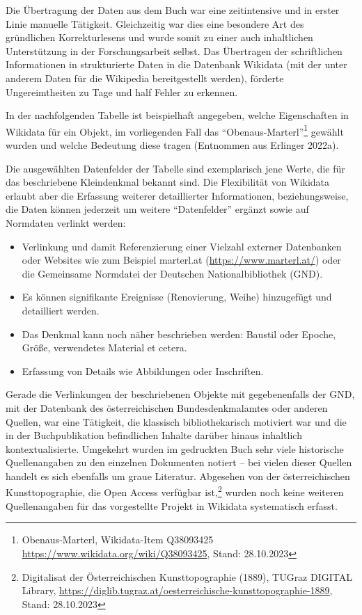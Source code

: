 \documentclass[a4paper,
fontsize=11pt,
oneside,
numbers=noperiodatend,
parskip=half-,
bibliography=totoc,
final
]{scrartcl}
\begin{document}
Die Übertragung der Daten aus dem Buch war eine zeitintensive und in
erster Linie manuelle Tätigkeit. Gleichzeitig war dies eine besondere
Art des gründlichen Korrekturlesens und wurde somit zu einer auch
inhaltlichen Unterstützung in der Forschungsarbeit selbst. Das
Übertragen der schriftlichen Informationen in strukturierte Daten in die
Datenbank Wikidata (mit der unter anderem Daten für die Wikipedia
bereitgestellt werden), förderte Ungereimtheiten zu Tage und half Fehler
zu erkennen.

In der nachfolgenden Tabelle ist beispielhaft angegeben, welche
Eigenschaften in Wikidata für ein Objekt, im vorliegenden Fall das
\enquote{Obenaus-Marterl}\footnote{Obenaus-Marterl, Wikidata-Item
  Q38093425 \url{https://www.wikidata.org/wiki/Q38093425}, Stand:
  28.10.2023} gewählt wurden und welche Bedeutung diese tragen
(Entnommen aus Erlinger 2022a).



Die ausgewählten Datenfelder der Tabelle sind exemplarisch jene Werte,
die für das beschriebene Kleindenkmal bekannt sind. Die Flexibilität von
Wikidata erlaubt aber die Erfassung weiterer detaillierter
Informationen, beziehungsweise, die Daten können jederzeit um weitere
\enquote{Datenfelder} ergänzt sowie auf Normdaten verlinkt werden:

\begin{itemize}
\item
  Verlinkung und damit Referenzierung einer Vielzahl externer
  Datenbanken oder Websites wie zum Beispiel marterl.at
  (\url{https://www.marterl.at/}) oder die Gemeinsame Normdatei der
  Deutschen Nationalbibliothek (GND).
\item
  Es können signifikante Ereignisse (Renovierung, Weihe) hinzugefügt und
  detailliert werden.
\item
  Das Denkmal kann noch näher beschrieben werden: Baustil oder Epoche,
  Größe, verwendetes Material et cetera.
\item
  Erfassung von Details wie Abbildungen oder Inschriften.
\end{itemize}

Gerade die Verlinkungen der beschriebenen Objekte mit gegebenenfalls der
GND, mit der Datenbank des österreichischen Bundesdenkmalamtes oder
anderen Quellen, war eine Tätigkeit, die klassisch bibliothekarisch
motiviert war und die in der Buchpublikation befindlichen Inhalte
darüber hinaus inhaltlich kontextualisierte. Umgekehrt wurden im
gedruckten Buch sehr viele historische Quellenangaben zu den einzelnen
Dokumenten notiert -- bei vielen dieser Quellen handelt es sich
ebenfalls um graue Literatur. Abgesehen von der österreichischen
Kunsttopographie, die Open Access verfügbar ist,\footnote{Digitalisat
  der Österreichischen Kunsttopographie (1889), TUGraz DIGITAL Library,
  \url{https://diglib.tugraz.at/oesterreichische-kunsttopographie-1889},
  Stand: 28.10.2023} wurden noch keine weiteren Quellenangaben für das
vorgestellte Projekt in Wikidata systematisch erfasst.
\end{document}
